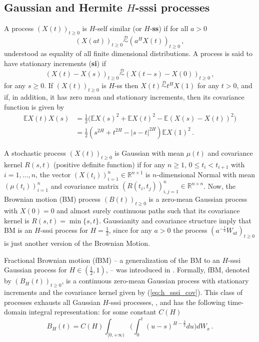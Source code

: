 \documentclass[a4paper]{article}
\newcommand{\Real}{\mathbb{R}}
\newcommand{\ex}{\mathbb{E}}
\newcommand{\Dcal}{\mathcal{D}}
\begin{document}
\subsection{Gaussian and Hermite $H$-sssi processes} %
\label{sub:h_sssi_proc}

A process $(X(t))_{t\geq0}$ is $H$-self similar (or $H$-\textbf{ss}) if for all $a>0$
\begin{equation*} \label{eq:def_ss}
    (X(at))_{t\geq0} \overset{\Dcal}{\sim} (a^H X(t))_{t\geq0} \,,
\end{equation*}
understood as equality of all finite dimensional distributions. A process is said
to have stationary increments (\textbf{si}) if
\begin{equation*}\label{eq:def_si}
    (X(t)-X(s))_{t\geq0} \overset{\Dcal}{\sim} (X(t-s)-X(0))_{t\geq0} \,,
\end{equation*}
for any $s\geq 0$. If $(X(t))_{t\geq0}$ is $H$-ss then $X(t) \overset{\Dcal}{\sim} t^H X(1)$
for any $t>0$, and if, in addition, it has zero mean and stationary increments, then
its covariance function is given by
\begin{align}\label{eq:h_sssi_cov}
    \ex X(t) X(s)
        &= \frac{1}{2} \bigl(\ex X(s)^2 + \ex X(t)^2 - \ex(X(s) - X(t))^2 \bigr) \nonumber \\
        &= \frac{1}{2} (s^{2H}  + t^{2H} - |s-t|^{2H}) \ex X(1)^2 \,.
\end{align}

A stochastic process $(X(t))_{t\geq0}$ is Gaussian with mean $\mu(t)$ and covariance
kernel $R(s,t)$ (positive definite function) if for any $n\geq 1$, $0 \leq t_i < t_{i+1}$
with $i=1,\ldots,n$, the vector $(X(t_i))_{i=1}^n\in \Real^{n\times1}$ is $n$-dimensional
Normal with mean $(\mu(t_i))_{i=1}^n$ and covariance matrix $(R(t_i, t_j))_{i,j=1}^n\in \Real^{n\times n}$.
Now, the Brownian motion (BM) process $(B(t))_{t\geq0}$ is a zero-mean Gaussian process
with $X(0)=0$ and almost surely continuous paths such that its covariance kernel is
$R(s,t)=\min\{s, t\}$. Gaussianity and covariance structure imply that BM is an $H$-sssi
process for $H=\frac{1}{2}$, since for any $a>0$ the process $(a^{-\frac{1}{2}} W_{at})_{t\geq0}$
is just another version of the Brownian Motion.

Fractional Brownian motion (fBM) -- a generalization of the BM to an $H$-sssi Gaussian
process for $H \in (\frac{1}{2}, 1)$, -- was introduced in \cite{doi:10.1137/1010093}.
Formally, fBM, denoted by $(B_H(t))_{t\geq0}$, is a continuous zero-mean Gaussian
process with stationary increments and the covariance kernel given by (\ref{eq:h_sssi_cov}).
This class of processes exhausts all Gaussian $H$-sssi processes, \cite{embrechts2002},
and has the following time-domain integral representation: for some constant $C(H)$
\begin{equation}\label{eq:fbm_int_repr}
    B_H(t) = C(H) \int_{[0,+\infty)} \biggl(
            \int_0^t (u-s)^{H-\frac{3}{2}} du
        \biggr) dW_x \,.
\end{equation}
\end{document}

